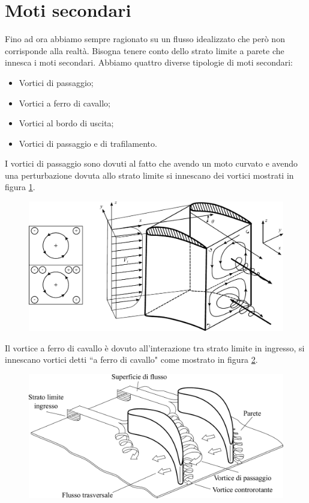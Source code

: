 \section{Moti secondari}
Fino ad ora abbiamo sempre ragionato su un flusso idealizzato che però non corrisponde alla realtà. Bisogna tenere conto dello strato limite a parete che innesca i moti secondari.
Abbiamo quattro diverse tipologie di moti secondari:
\begin{itemize}
\item Vortici di passaggio;
\item Vortici a ferro di cavallo;
\item Vortici al bordo di uscita;
\item Vortici di passaggio e di trafilamento.
\end{itemize}
I vortici di passaggio sono dovuti al fatto che avendo un moto curvato e avendo una perturbazione dovuta allo strato limite si innescano dei vortici mostrati in figura \ref{fig:VortPass}.
\begin{figure}[h!]
\centering
  \includegraphics[width=.8\textwidth]{fig/VortPass.pdf}
\caption{}
\label{fig:VortPass}
\end{figure}
Il vortice a ferro di cavallo è dovuto all'interazione tra strato limite in ingresso, si innescano vortici detti ``a ferro di cavallo" come mostrato in figura \ref{fd:VortFerrCav}.
\begin{figure}[h!]
\centering
  \includegraphics[width=.8\textwidth]{fig/VortFerrCav.pdf}
\caption{}
\label{fd:VortFerrCav}
\end{figure}
